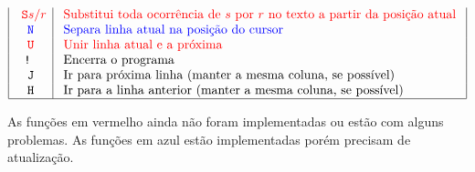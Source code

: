 \documentclass{article}
\begin{document}
$$\begin{array}{|c|l|}
\color{red}\texttt{ S}s/r & \color{red}\text { Substitui toda ocorrência de } s \text { por } r \text { no texto a partir da posição atual } \\
\color{blue}\texttt{ N } & \color{blue}\text { Separa linha atual na posição do cursor } \\
\color{red}\texttt{ U } & \color{red}\text { Unir linha atual e a próxima } \\
\texttt{ ! } & \text { Encerra o programa } \\
\texttt{ J } & \text { Ir para próxima linha (manter a mesma coluna, se possível) } \\
\texttt{ H } & \text { Ir para a linha anterior (manter a mesma coluna, se possível) } \\
\hline
\end{array}
$$

As funções em vermelho ainda não foram implementadas ou estão com alguns problemas. As funções em azul estão implementadas porém precisam de atualização.
\end{document}
